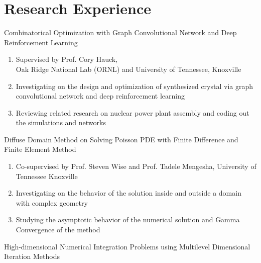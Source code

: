 \documentclass[11pt,letterpaper]{report}
\begin{document}
    \section*{Research Experience}

    \begin{tablist}

    \item[2024-] Combinatorical Optimization with Graph Convolutional Network and Deep Reinforcement Learning
        \begin{enumerate}
            \item Supervised by Prof. Cory Hauck,\\
            Oak Ridge National Lab (ORNL) and University of Tennessee, Knoxville
            \item Investigating on the design and optimization of synthesized crystal via graph convolutional network and deep reinforcement learning
            \item Reviewing related research on nuclear power plant assembly and coding out the simulations and networks
        \end{enumerate}
        \vspace{1cm}

        \item[2022-] Diffuse Domain Method on Solving Poisson PDE with Finite Difference and Finite Element Method
        \begin{enumerate}
            \item Co-supervised by Prof. Steven Wise and Prof. Tadele Mengesha, University of Tennessee Knoxville
            \item Investigating on the behavior of the solution inside and outside a domain with complex geometry
            \item Studying the asymptotic behavior of the numerical solution and Gamma Convergence of the method
        \end{enumerate}
        \vspace{1cm}
        \item[2022] High-dimensional Numerical Integration Problems using Multilevel Dimensional Iteration Methods


\end{tablist}
\end{document}
